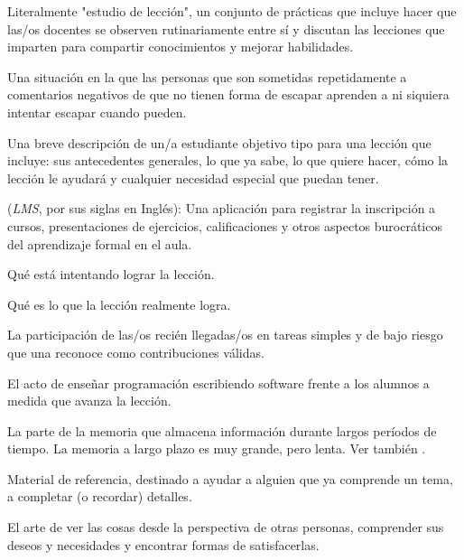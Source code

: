 \begin{description}
 Literalmente "estudio de lección", un conjunto de prácticas que incluye hacer que las/os docentes se observen rutinariamente entre sí y discutan las lecciones que imparten para compartir conocimientos y mejorar habilidades.

 Una situación en la que las personas que son sometidas repetidamente a comentarios negativos de que no tienen forma de escapar aprenden a ni siquiera intentar escapar cuando pueden.

 Una breve descripción de un/a estudiante objetivo tipo
para una lección que incluye: sus antecedentes generales, lo que ya sabe, lo que quiere hacer, cómo la lección le ayudará y cualquier necesidad especial que puedan tener.

 (\emph{LMS}, por sus siglas en Inglés): Una aplicación para registrar la inscripción a cursos, presentaciones de ejercicios, calificaciones y otros aspectos burocráticos del aprendizaje formal en el aula.

 Qué está intentando lograr la lección.

 Qué es lo que la lección realmente logra.

 La participación de las/os recién llegadas/os en tareas simples y de bajo riesgo que una  
 reconoce como contribuciones válidas.

 El acto de enseñar programación 
escribiendo software frente a los alumnos a medida que avanza la lección.

 La parte de la memoria que 
almacena información durante largos períodos de tiempo. La memoria a largo plazo es muy grande, 
pero lenta. Ver también .

 Material de referencia, destinado a ayudar a alguien que ya comprende un tema, a completar (o recordar) detalles.

 El arte de ver las cosas desde la perspectiva 
de otras personas, comprender sus deseos y necesidades y encontrar formas de satisfacerlas.



\end{description}
